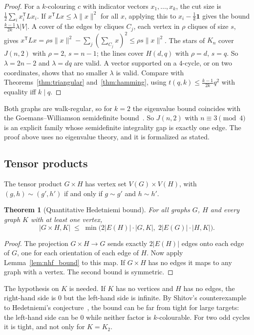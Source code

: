 \documentclass{article}
\newtheorem{theorem}{Theorem}[section]
\theoremstyle{definition}
\begin{document}
\begin{proof}
For a $k$-colouring $c$ with indicator vectors $x_1,\dots,x_k$, the cut size is
$\frac12\sum_ix_i^{\mathsf T}Lx_i$.  If $x^{\mathsf T}Lx\le\lambda\|x\|^2$ for all
$x$, applying this to $x_i-\frac1k\mathbf 1$ gives the bound
$\frac{k-1}{2k}\lambda|V|$.  A cover of the edges by cliques $C_j$, each vertex in
$\rho$ cliques of size $s$, gives $x^{\mathsf T}Lx=\rho s\|x\|^2-\sum_j(\sum_{C_j}x)^2
\le\rho s\|x\|^2$.  The stars of $K_n$ cover $J(n,2)$ with $\rho=2$, $s=n-1$; the
lines cover $H(d,q)$ with $\rho=d$, $s=q$.  So $\lambda=2n-2$ and $\lambda=dq$
are valid.  A vector supported on a $4$-cycle, or on two coordinates, shows that no
smaller $\lambda$ is valid.  Compare with Theorems~\ref{thm:triangular}
and~\ref{thm:hamming}, using $t(q,k)\le\frac{k-1}{2k}q^2$ with equality iff
$k\mid q$.
\end{proof}

Both graphs are walk-regular, so for $k=2$ the eigenvalue bound coincides with the
Goemans--Williamson semidefinite bound~\cite{vandam2016}.  So $J(n,2)$ with
$n\equiv3\pmod4$ is an explicit family whose semidefinite integrality gap is
exactly one edge.  The proof above uses no eigenvalue theory, and it is formalized
as stated.

\subsection{Tensor products}

The tensor product $G\times H$ has vertex set $V(G)\times V(H)$, with
$(g,h)\sim(g',h')$ if and only if $g\sim g'$ and $h\sim h'$.

\begin{theorem}[Quantitative Hedetniemi bound]
\label{thm:hedetniemi}
For all graphs $G$, $H$ and every graph $K$ with at least one vertex,
\[
  |G\times H,K|\;\le\;\min\bigl(2|E(H)|\cdot|G,K|,\;2|E(G)|\cdot|H,K|\bigr).
\]
\end{theorem}

\begin{proof}
The projection $G\times H\to G$ sends exactly $2|E(H)|$ edges onto each edge of
$G$, one for each orientation of each edge of $H$.  Now apply
Lemma~\ref{lem:nhf_bound} to this map.  If $G\times H$ has no edges it maps to
any graph with a vertex.  The second bound is symmetric.
\end{proof}

The hypothesis on $K$ is needed.  If $K$ has no vertices and $H$ has no edges,
the right-hand side is $0$ but the left-hand side is infinite.  By
Shitov's counterexample to Hedetniemi's conjecture~\cite{shitov2019}, the bound
can be far from tight for large targets: the left-hand side can be $0$ while
neither factor is $k$-colourable.  For two odd cycles it is tight, and not only
for $K=K_2$.
\end{document}
